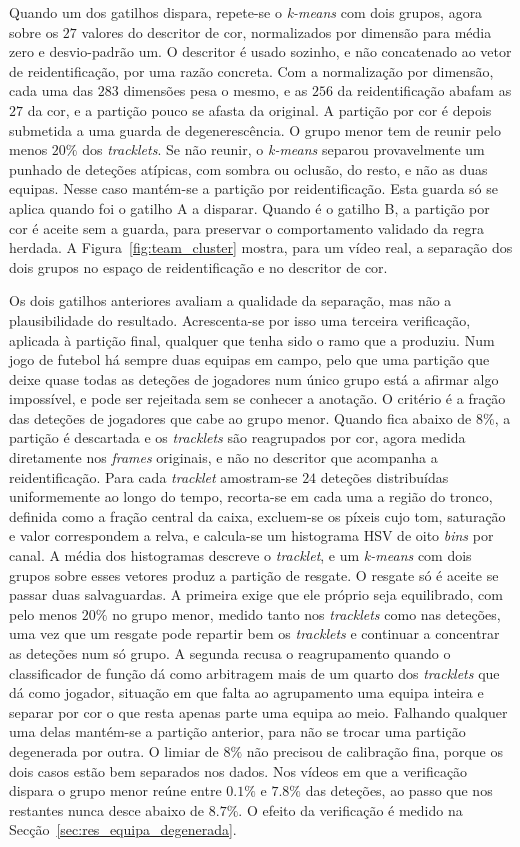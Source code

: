 Quando um dos gatilhos dispara, repete-se o \emph{k-means} com dois grupos, agora sobre os $27$
valores do descritor de cor, normalizados por dimensão para média zero e desvio-padrão um. O
descritor é usado sozinho, e não concatenado ao vetor de reidentificação, por uma razão
concreta. Com a normalização por dimensão, cada uma das $283$ dimensões pesa o mesmo, e as $256$ da
reidentificação abafam as $27$ da cor, e a partição pouco se afasta da original. A partição por cor é depois submetida a uma guarda de
degenerescência. O grupo menor tem de reunir pelo menos $20\%$ dos \emph{tracklets}. Se não
reunir, o \emph{k-means} separou provavelmente um punhado de deteções atípicas, com sombra ou
oclusão, do resto, e não as duas equipas. Nesse caso mantém-se a partição por reidentificação.
Esta guarda só se aplica quando foi o gatilho A a disparar. Quando é o gatilho B, a partição por
cor é aceite sem a guarda, para preservar o comportamento validado da regra herdada. A
Figura~\ref{fig:team_cluster} mostra, para um vídeo real, a separação dos dois grupos no espaço de
reidentificação e no descritor de cor.

Os dois gatilhos anteriores avaliam a qualidade da separação, mas não a plausibilidade do resultado.
Acrescenta-se por isso uma terceira verificação, aplicada à partição final, qualquer que tenha sido o
ramo que a produziu. Num jogo de futebol há sempre duas equipas em campo, pelo que uma partição que
deixe quase todas as deteções de jogadores num único grupo está a afirmar algo impossível, e pode ser
rejeitada sem se conhecer a anotação. O critério é a fração das deteções de jogadores que cabe ao
grupo menor. Quando fica abaixo de $8\%$, a partição é descartada e os \emph{tracklets} são
reagrupados por cor, agora medida diretamente nos \emph{frames} originais, e não no descritor que
acompanha a reidentificação. Para cada \emph{tracklet} amostram-se $24$ deteções distribuídas
uniformemente ao longo do tempo, recorta-se em cada uma a região do tronco, definida como a fração
central da caixa, excluem-se os píxeis cujo tom, saturação e valor correspondem a relva, e calcula-se
um histograma HSV de oito \emph{bins} por canal. A média dos histogramas descreve o \emph{tracklet},
e um \emph{k-means} com dois grupos sobre esses vetores produz a partição de resgate. O resgate só é
aceite se passar duas salvaguardas. A primeira exige que ele próprio seja equilibrado, com pelo menos
$20\%$ no grupo menor, medido tanto nos \emph{tracklets} como nas deteções, uma vez que um resgate
pode repartir bem os \emph{tracklets} e continuar a concentrar as deteções num só grupo. A segunda
recusa o reagrupamento quando o classificador de função dá como arbitragem mais de um quarto dos
\emph{tracklets} que dá como jogador, situação em que falta ao agrupamento uma equipa inteira e
separar por cor o que resta apenas parte uma equipa ao meio. Falhando qualquer uma delas mantém-se a
partição anterior, para não se trocar uma partição degenerada por outra. O
limiar de $8\%$ não precisou de calibração fina, porque os dois casos estão bem separados nos dados.
Nos vídeos em que a verificação dispara o grupo menor reúne entre $0.1\%$ e $7.8\%$ das deteções, ao
passo que nos restantes nunca desce abaixo de $8.7\%$. O efeito da verificação é medido na
Secção~\ref{sec:res_equipa_degenerada}.


